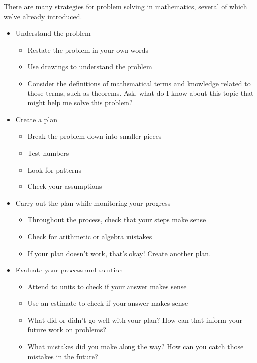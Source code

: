 \documentclass{ximera}
\begin{document}
\begin{MM}
There are many strategies for problem solving in mathematics, several of which we've already introduced.
\begin{itemize}
\item Understand the problem
\begin{itemize}
\item Restate the problem in your own words
\item Use drawings to understand the problem
\item Consider the definitions of mathematical terms and knowledge related to those terms, such as theorems.  Ask, what do I know about this topic that might help me solve this problem? 
\end{itemize}
\item Create a plan
\begin{itemize}
\item Break the problem down into smaller pieces
\item Test numbers
\item Look for patterns
\item Check your assumptions
\end{itemize}
\item Carry out the plan while monitoring your progress
\begin{itemize}
\item Throughout the process, check that your steps make sense
\item Check for arithmetic or algebra mistakes
\item If your plan doesn't work, that's okay! Create another plan.
\end{itemize}
\item Evaluate your process and solution
\begin{itemize}
\item Attend to units to check if your answer makes sense
\item Use an estimate to check if your answer makes sense
\item What did or didn't go well with your plan? How can that inform your future work on problems?
\item What mistakes did you make along the way? How can you catch those mistakes in the future?
\end{itemize}


\end{itemize}
\end{MM}
\end{document}
